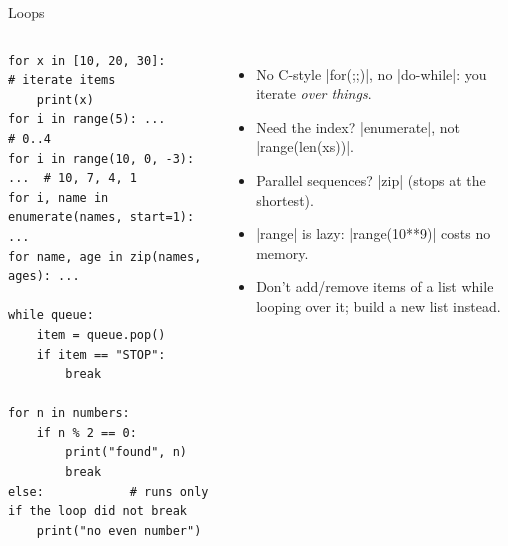 \documentclass[aspectratio=169,9pt]{beamer}
\begin{document}
\begin{frame}[fragile]{Loops}
\begin{columns}[T]
\begin{lstlisting}
for x in [10, 20, 30]:          # iterate items
    print(x)
for i in range(5): ...          # 0..4
for i in range(10, 0, -3): ...  # 10, 7, 4, 1
for i, name in enumerate(names, start=1): ...
for name, age in zip(names, ages): ...

while queue:
    item = queue.pop()
    if item == "STOP":
        break

for n in numbers:
    if n % 2 == 0:
        print("found", n)
        break
else:            # runs only if the loop did not break
    print("no even number")
\end{lstlisting}
\begin{itemize}\setlength\itemsep{5pt}
  \item No C-style |for(;;)|, no |do-while|: you iterate
        \emph{over things}.
  \item Need the index? |enumerate|, not |range(len(xs))|.
  \item Parallel sequences? |zip| (stops at the shortest).
  \item |range| is lazy: |range(10**9)| costs no memory.
  \item Don't add/remove items of a list while looping over it;
        build a new list instead.
\end{itemize}
\end{columns}
\end{frame}
\end{document}
